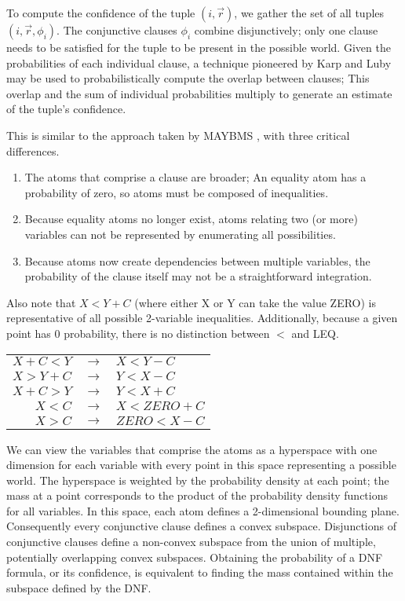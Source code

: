 To compute the confidence of the tuple $(i, \vec{r})$, we gather the set of all tuples $(i,\vec{r},\phi_i)$.  The conjunctive clauses $\phi_i$ combine disjunctively; only one clause needs to be satisfied for the tuple to be present in the possible world.  Given the probabilities of each individual clause, a technique pioneered by Karp and Luby \cite{KL1983} may be used to probabilistically compute the overlap between clauses; This overlap and the sum of individual probabilities multiply to generate an estimate of the tuple's confidence.

This is similar to the approach taken by MAYBMS \cite{AKO-VLDBDEMO-2007}, with three critical differences.
\begin{enumerate}
\item The atoms that comprise a clause are broader; An equality atom has a probability of zero, so atoms must be composed of inequalities.
\item Because equality atoms no longer exist, atoms relating two (or more) variables can not be represented by enumerating all possibilities.
\item Because atoms now create dependencies between multiple variables, the probability of the clause itself may not be a straightforward integration.
\end{enumerate}

Also note that $X < Y + C$ (where either X or Y can take the value ZERO) is representative of all possible 2-variable inequalities.  Additionally, because a given point has 0 probability, there is no distinction between $<$ and LEQ.

{\footnotesize
\begin{center}
\begin{tabular}{rcl}
$X + C < Y$ & $\rightarrow$ & $X < Y - C$ \\
$X > Y + C$ & $\rightarrow$ & $Y < X - C$ \\
$X + C > Y$ & $\rightarrow$ & $Y < X + C$ \\
$X < C$ & $\rightarrow$ & $X < ZERO + C$ \\
$X > C$ & $\rightarrow$ & $ZERO < X - C$ \\
\end{tabular}
\end{center}
}


We can view the variables that comprise the atoms as a hyperspace with one dimension for each variable with every point in this space representing a possible world.  The hyperspace is weighted by the probability density at each point; the mass at a point corresponds to the product of the probability density functions for all variables.  In this space, each atom defines a 2-dimensional bounding plane.  Consequently every conjunctive clause defines a convex subspace.  Disjunctions of conjunctive clauses define a non-convex subspace from the union of multiple, potentially overlapping convex subspaces.  Obtaining the probability of a DNF formula, or its confidence, is equivalent to finding the mass contained within the subspace defined by the DNF.

